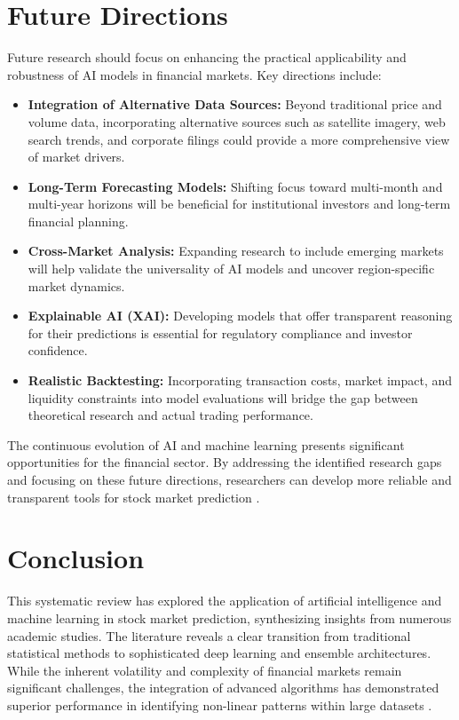 \documentclass[11pt,a4paper]{article}
\begin{document}
\section{Future Directions}

Future research should focus on enhancing the practical applicability and robustness of AI models in
financial markets. Key directions include:

\begin{itemize}[leftmargin=1.4em]
  \item \textbf{Integration of Alternative Data Sources:} Beyond traditional price and volume data,
  incorporating alternative sources such as satellite imagery, web search trends, and corporate
  filings could provide a more comprehensive view of market drivers.
  \item \textbf{Long-Term Forecasting Models:} Shifting focus toward multi-month and multi-year
  horizons will be beneficial for institutional investors and long-term financial planning.
  \item \textbf{Cross-Market Analysis:} Expanding research to include emerging markets will help
  validate the universality of AI models and uncover region-specific market dynamics.
  \item \textbf{Explainable AI (XAI):} Developing models that offer transparent reasoning for their
  predictions is essential for regulatory compliance and investor confidence.
  \item \textbf{Realistic Backtesting:} Incorporating transaction costs, market impact, and liquidity
  constraints into model evaluations will bridge the gap between theoretical research and actual
  trading performance.
\end{itemize}

The continuous evolution of AI and machine learning presents significant opportunities for the
financial sector. By addressing the identified research gaps and focusing on these future directions,
researchers can develop more reliable and transparent tools for stock market prediction
\cite{sonkavde2023,lin2024}.

\section{Conclusion}

This systematic review has explored the application of artificial intelligence and machine learning in
stock market prediction, synthesizing insights from numerous academic studies. The literature
reveals a clear transition from traditional statistical methods to sophisticated deep learning and
ensemble architectures. While the inherent volatility and complexity of financial markets remain
significant challenges, the integration of advanced algorithms has demonstrated superior performance
in identifying non-linear patterns within large datasets \cite{ferreira2021,bansal2022}.
\end{document}
